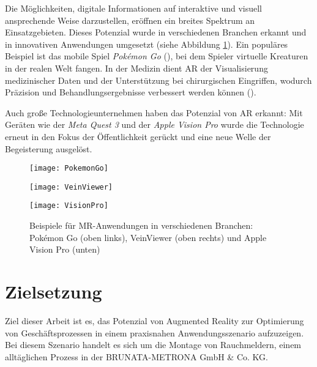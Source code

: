 Die Möglichkeiten, digitale Informationen auf interaktive und visuell ansprechende Weise darzustellen, eröffnen ein breites Spektrum an Einsatzgebieten. Dieses Potenzial wurde in verschiedenen Branchen erkannt und in innovativen Anwendungen umgesetzt (siehe Abbildung \ref{fig:MRApplications}). Ein populäres Beispiel ist das mobile Spiel \textit{Pokémon Go} (\citet{wikipedia2024pokemonGo}), bei dem Spieler virtuelle Kreaturen in der realen Welt fangen. In der Medizin dient AR der Visualisierung medizinischer Daten und der Unterstützung bei chirurgischen Eingriffen, wodurch Präzision und Behandlungsergebnisse verbessert werden können (\citet{chen2017medicalMR}).

Auch große Technologieunternehmen haben das Potenzial von AR erkannt: Mit Geräten wie der \textit{Meta Quest 3} und der \textit{Apple Vision Pro} wurde die Technologie erneut in den Fokus der Öffentlichkeit gerückt und eine neue Welle der Begeisterung ausgelöst. \cite{doerner2022virtual, boulanger2024applications}

\begin{figure}[h]
    \centering
    \begin{minipage}{0.45\textwidth}
        \centering
        \texttt{[image: PokemonGo]}
    \end{minipage}
    \begin{minipage}{0.45\textwidth}
        \centering
        \texttt{[image: VeinViewer]}
    \end{minipage}
    \begin{minipage}{0.45\textwidth}
        \centering
        \texttt{[image: VisionPro]}
    \end{minipage}
    \caption{Beispiele für MR-Anwendungen in verschiedenen Branchen: Pokémon Go (oben links), VeinViewer (oben rechts) und Apple Vision Pro (unten) \cite{wikipedia2024pokemonGo, chen2017medicalMR, apple2023visionPro}}
    \label{fig:MRApplications}
\end{figure}

\section{Zielsetzung}

Ziel dieser Arbeit ist es, das Potenzial von Augmented Reality zur Optimierung von Geschäftsprozessen in einem praxisnahen Anwendungsszenario aufzuzeigen. Bei diesem Szenario handelt es sich um die Montage von Rauchmeldern, einem alltäglichen Prozess in der BRUNATA-METRONA GmbH \& Co. KG.

